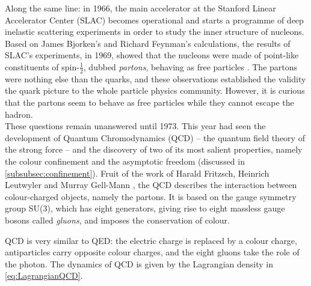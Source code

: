 Along the same line: in 1966, the main accelerator at the Stanford Linear Accelerator Center (SLAC) becomes operational and starts a programme of deep inelastic scattering experiments in order to study the inner structure of nucleons. Based on James Bjorken's \cite{bjorkenCurrentAlgebraSmall2018} and Richard Feynman's  \cite{feynmanBehaviorHadronCollisions1988} calculations, the results of SLAC's experiments, in 1969, showed that the nucleons were made of point-like constituents of spin-$\frac{1}{2}$, dubbed \textit{partons}, behaving as free particles \cite{peskinIntroductionQuantumField2018}. The partons were nothing else than the quarks, and these observations established the validity the quark picture to the whole particle physics community. However, it is curious that the partons seem to behave as free particles while they cannot escape the hadron.\\

These questions remain unanswered until 1973. This year had seen the development of Quantum Chromodynamics (QCD) -- the quantum field theory of the strong force -- and the discovery of two of its most salient properties, namely the colour confinement and the asymptotic freedom (discussed in \Sec\ref{subsubsec:confinement}). Fruit of the work of Harald Fritzsch, Heinrich Leutwyler and Murray Gell-Mann \cite{fritzschAdvantagesColorOctet1973}, the QCD describes the interaction between colour-charged objects, namely the partons. It is based on the gauge symmetry group SU(3), which has eight generators, giving rise to eight massless gauge bosons called \textit{gluons}, and imposes the conservation of colour. 

QCD is very similar to QED: the electric charge is replaced by a colour charge, antiparticles carry opposite colour charges, and the eight gluons take the role of the photon. The dynamics of QCD is given by the Lagrangian density in \eq\ref{eq:LagrangianQCD}.\\

